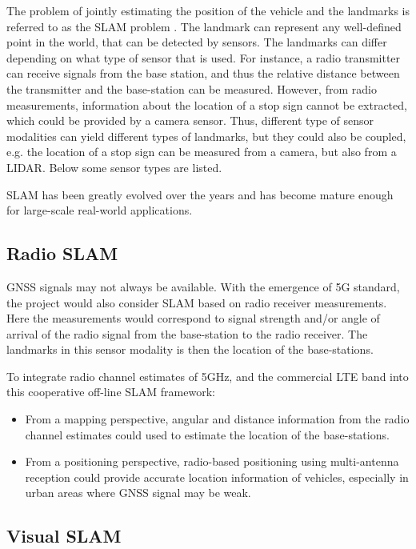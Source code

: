 The problem of jointly estimating the position of the vehicle and the landmarks 
is referred to as the \gls{SLAM} problem 
\cite{DBLP:journals/corr/CadenaCCLSN0L16}. The landmark can represent any 
well-defined point in the world, that can be detected by sensors. The landmarks 
can differ depending on what type of sensor that is used. For instance, a radio 
transmitter can receive signals from the base station, and thus the relative 
distance between the transmitter and the base-station can be measured. However, 
from radio measurements, information about the location of a stop sign cannot 
be extracted, which could be provided by a camera sensor. Thus, different type 
of sensor modalities can yield different types of landmarks, but they could 
also be coupled, e.g. the location of a stop sign can be measured from a 
camera, but also from a \gls{LIDAR}. Below some sensor types are listed.

\gls{SLAM} has been greatly evolved over the years and has become mature enough 
for large-scale real-world applications. 

\subsection{Radio SLAM}

\gls{GNSS} signals may not always be available. With the emergence of 5G
standard, the project would also consider \gls{SLAM} based on radio receiver 
measurements. Here the measurements would correspond to signal strength and/or 
angle of arrival of the radio signal from the base-station to the radio 
receiver. The landmarks in this sensor modality is then the location of the 
base-stations. 

To integrate radio channel
estimates of 5GHz, and the commercial \gls{LTE} band into this cooperative 
off-line \gls{SLAM} framework:
\begin{itemize}
\item   From a mapping perspective, angular and distance information
  from the radio channel estimates could used to estimate the location of the 
  base-stations.
\item From a positioning perspective, radio-based positioning using
multi-antenna reception could provide accurate location information of
vehicles, especially in urban areas where \gls{GNSS} signal may be weak.
\end{itemize}

\subsection{Visual SLAM}

